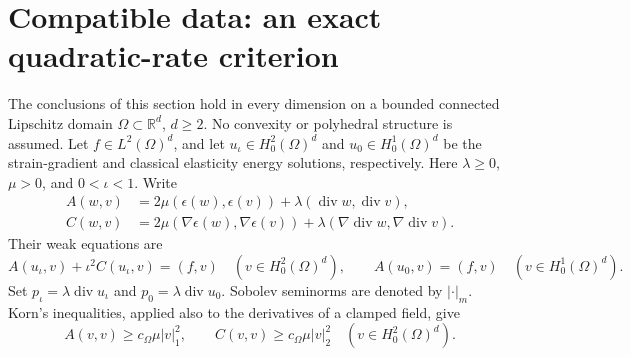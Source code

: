 \documentclass[11pt,a4paper]{article}
\theoremstyle{remark}
\numberwithin{equation}{section}
\begin{document}
\section{Compatible data: an exact quadratic-rate criterion}
\label{comp:section}

The conclusions of this section hold in every dimension on a bounded
connected Lipschitz domain $\Omega\subset\mathbb R^d$, $d\ge2$. No convexity or
polyhedral structure is assumed. Let $f\in L^2(\Omega)^d$, and let
$u_\iota\in H^2_0(\Omega)^d$ and $u_0\in H^1_0(\Omega)^d$ be the
strain-gradient and classical elasticity energy solutions, respectively.
Here $\lambda\ge0$, $\mu>0$, and $0<\iota<1$. Write
\[
 \begin{split}
 A(w,v)&=2\mu(\epsilon(w),\epsilon(v))
                +\lambda(\operatorname{div}w,\operatorname{div}v),\\
 C(w,v)&=2\mu(\nabla\epsilon(w),\nabla\epsilon(v))
                +\lambda(\nabla\operatorname{div}w,
                          \nabla\operatorname{div}v).
 \end{split}
\]
Their weak equations are
\[
 A(u_\iota,v)+\iota^2C(u_\iota,v)=(f,v)
       \quad(v\in H^2_0(\Omega)^d),\qquad
 A(u_0,v)=(f,v)\quad(v\in H^1_0(\Omega)^d).
\]
Set $p_\iota=\lambda\operatorname{div}u_\iota$ and
$p_0=\lambda\operatorname{div}u_0$. Sobolev seminorms are denoted by
$|\cdot|_m$. Korn's inequalities, applied also to the derivatives of a
clamped field, give
\[
 A(v,v)\ge c_\Omega\mu|v|_1^2,
 \qquad C(v,v)\ge c_\Omega\mu|v|_2^2
 \quad(v\in H^2_0(\Omega)^d).
\]
\end{document}
